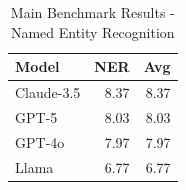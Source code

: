 \begin{table}[htbp]
\centering
\caption{Main Benchmark Results - Named Entity Recognition}
\label{tab:ner_main_results}
\begin{tabular}{lrr}
\toprule
Model & NER & \textbf{Avg} \\
\midrule
Claude-3.5 & 8.37 & 8.37 \\
GPT-5 & 8.03 & 8.03 \\
GPT-4o & 7.97 & 7.97 \\
Llama & 6.77 & 6.77 \\
\bottomrule
\end{tabular}
\end{table}
